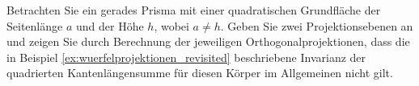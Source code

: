 \begin{exercise} \label{ex:geradesprisma}
    Betrachten Sie ein gerades Prisma mit einer quadratischen Grundfläche der Seitenlänge $a$ und der Höhe $h$, wobei $a \neq h$. Geben Sie zwei Projektionsebenen an und zeigen Sie durch Berechnung der jeweiligen Orthogonalprojektionen, dass die in Beispiel \ref{ex:wuerfelprojektionen_revisited} beschriebene Invarianz der quadrierten Kantenlängensumme für diesen Körper im Allgemeinen nicht gilt.
\end{exercise}